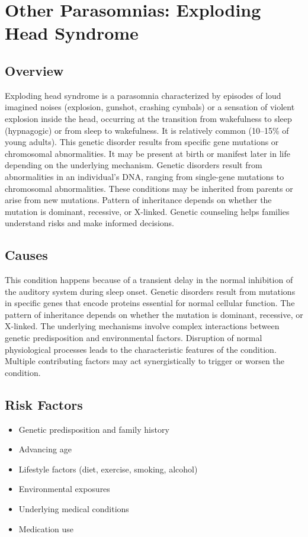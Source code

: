 \chapter{Other Parasomnias: Exploding Head Syndrome}
\label{sec:Exploding Head Syndrome}

\section{Overview}
Exploding head syndrome is a parasomnia characterized by episodes of loud imagined noises (explosion, gunshot, crashing cymbals) or a sensation of violent explosion inside the head, occurring at the transition from wakefulness to sleep (hypnagogic) or from sleep to wakefulness. It is relatively common (10--15\% of young adults). This genetic disorder results from specific gene mutations or chromosomal abnormalities. It may be present at birth or manifest later in life depending on the underlying mechanism. Genetic disorders result from abnormalities in an individual's DNA, ranging from single-gene mutations to chromosomal abnormalities. These conditions may be inherited from parents or arise from new mutations. Pattern of inheritance depends on whether the mutation is dominant, recessive, or X-linked. Genetic counseling helps families understand risks and make informed decisions.
\section{Causes}
This condition happens because of a transient delay in the normal inhibition of the auditory system during sleep onset. Genetic disorders result from mutations in specific genes that encode proteins essential for normal cellular function. The pattern of inheritance depends on whether the mutation is dominant, recessive, or X-linked. The underlying mechanisms involve complex interactions between genetic predisposition and environmental factors. Disruption of normal physiological processes leads to the characteristic features of the condition. Multiple contributing factors may act synergistically to trigger or worsen the condition.
\section{Risk Factors}


\begin{itemize}[noitemsep]
  \item Genetic predisposition and family history
  \item Advancing age
  \item Lifestyle factors (diet, exercise, smoking, alcohol)
  \item Environmental exposures
  \item Underlying medical conditions
  \item Medication use
\end{itemize}
